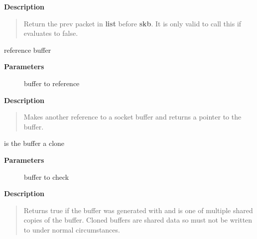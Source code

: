 \documentclass[a4paper,8pt,english]{sphinxmanual}
\begin{document}
\textbf{Description}
\begin{quote}

Return the prev packet in \textbf{list} before \textbf{skb}.  It is only valid to
call this if {\hyperref[networking/kapi:c.skb_queue_is_first]{\emph{}}} evaluates to false.
\end{quote}

\begin{fulllineitems}
\label{networking/kapi:c.skb_get}
reference buffer

\end{fulllineitems}


\textbf{Parameters}
\begin{description}
\item[{}] \leavevmode
buffer to reference

\end{description}

\textbf{Description}
\begin{quote}

Makes another reference to a socket buffer and returns a pointer
to the buffer.
\end{quote}

\begin{fulllineitems}
\label{networking/kapi:c.skb_cloned}
is the buffer a clone

\end{fulllineitems}


\textbf{Parameters}
\begin{description}
\item[{}] \leavevmode
buffer to check

\end{description}

\textbf{Description}
\begin{quote}

Returns true if the buffer was generated with {\hyperref[networking/kapi:c.skb_clone]{\emph{}}} and is
one of multiple shared copies of the buffer. Cloned buffers are
shared data so must not be written to under normal circumstances.
\end{quote}
\end{document}
